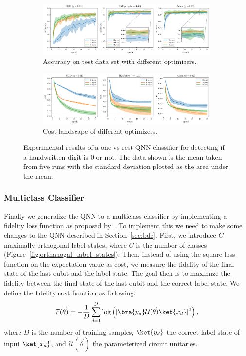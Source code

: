 \documentclass[a4paper,10pt]{article}
\begin{document}
\begin{figure}[ht]
	\centering
	\begin{subfigure}{1\textwidth}
		\centering
		\includegraphics[width=1\linewidth]{figures/qnn_ovr_accuracy.pdf}
		\caption{Accuracy on test data set with different optimizers.}
		\vspace*{4mm}
	\end{subfigure}
	\begin{subfigure}{1\textwidth}
		\centering
		\includegraphics[width=1\linewidth]{figures/qnn_ovr_cost.pdf}
		\caption{Cost landscape of different optimizers.}
	\end{subfigure}
	\caption{Experimental results of a one-vs-rest QNN classifier for detecting if a handwritten digit is 0 or not. The data shown is the mean taken from five runs with the standard deviation plotted as the area under the mean.}
	\label{fig:ovr_results}
\end{figure}

\subsubsection{Multiclass Classifier} \label{sec:multiclass_classifier}
Finally we generalize the QNN to a multiclass classifier by implementing a fidelity loss function as proposed by~\textcite{perez2019data}.
To implement this we need to make some changes to the QNN described in Section~\ref{sec:bdc}.
First, we introduce $C$ maximally orthogonal label states, where $C$ is the number of classes (Figure~\ref{fig:orthanogal_label_states}).
Then, instead of using the square loss function on the expectation value as cost, we measure the fidelity of the final state of the last qubit and the label state.
The goal then is to maximize the fidelity between the final state of the last qubit and the correct label state.
We define the fidelity cost function as following:
\begin{equation}
\mathcal{F}(\vec{\theta}) = - \dfrac{1}{D} \sum_{d=1}^{D} \log \left( \lvert \bra{y_d}\mathcal{U}(\vec{\theta})\ket{x_d} \rvert^2\right),
\end{equation}
where $D$ is the number of training samples, $\ket{y_d}$ the correct label state of input $\ket{x_d}$, and $\mathcal{U}(\vec{\theta})$ the parameterized circuit unitaries.
\end{document}
